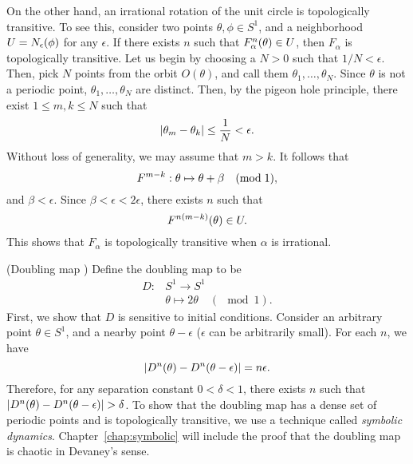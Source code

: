 \documentclass[10pt,draft,twoside]{book}
\begin{document}
\begin{example}
On the other hand, an irrational rotation of the unit circle is topologically transitive.
To see this, consider two points $\theta, \phi \in S^1$, and a neighborhood $U = N_{\epsilon}(\phi)$ for any $\epsilon$.
If there exists $n$ such that $F_\alpha^{n}(\theta) \in U$, then $F_\alpha$ is topologically transitive.
Let us begin by choosing a $N > 0$ such that $1/N < \epsilon$.
Then, pick $N$ points from the orbit $O(\theta)$, and call them $\theta_1, \ldots, \theta_N$.
Since $\theta$ is not a periodic point, $\theta_1, \ldots, \theta_N$ are distinct.
Then, by the pigeon hole principle, there exist $1 \leq m,k \leq N$ such that
\begin{equation*}
  \left |  \theta_m - \theta_k  \right | \leq \frac{1}{N} < \epsilon.
\end{equation*}
Without loss of generality, we may assume that $m > k$.
It follows that 
\begin{equation*}
  F^{m - k}: \theta \mapsto \theta + \beta \quad(\mathrm{mod}\; \mathrm{1}),
\end{equation*}
and $\beta < \epsilon$.
Since $\beta < \epsilon < 2\epsilon$, there exists $n$ such that
\begin{equation*}
  F^{n(m-k)}(\theta) \in U.
\end{equation*}
This shows that $F_\alpha$ is topologically transitive when $\alpha$ is irrational.
\end{example}
\begin{example}
  (Doubling map \citep{devaney})
  Define the doubling map to be 
  \begin{align*}
    D: &S^1 \to S^1  \\
    &\theta \mapsto 2\theta \quad(\mod{1}).
  \end{align*}
  First, we show that $D$ is sensitive to initial conditions. 
  Consider an arbitrary point $\theta \in S^1$, and a nearby point $\theta - \epsilon$ ($\epsilon$ can be arbitrarily small).
  For each $n$, we have
  \begin{equation*}
    \left |  D^{n}(\theta) - D^{n}(\theta - \epsilon)  \right | 
    = 
    n\epsilon.
  \end{equation*}
  Therefore, for any separation constant $0 < \delta < 1$, there exists $n$ such that $\left |  D^{n}(\theta) - D^{n}(\theta - \epsilon)  \right | > \delta$.
  To show that the doubling map has a dense set of periodic points and is topologically transitive, we use a technique called \textit{symbolic dynamics}.
  Chapter~\ref{chap:symbolic} will include the proof that the doubling map is chaotic in Devaney's sense.
\end{example}
\end{document}
